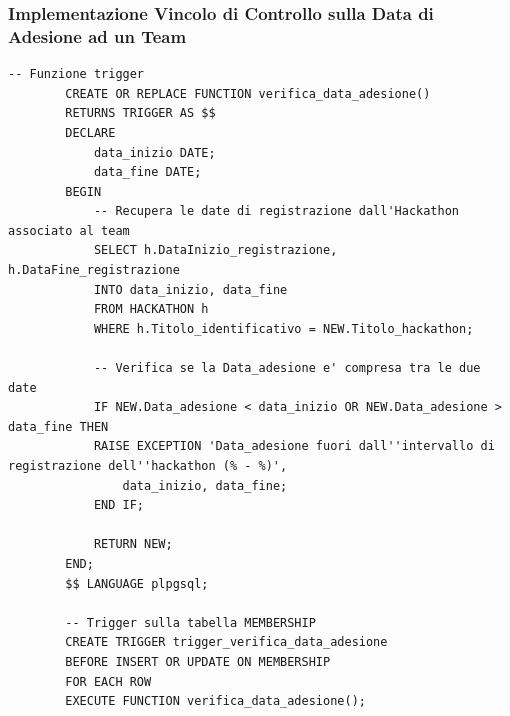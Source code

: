 \documentclass[a4paper, 10pt]{article}
\begin{document}
	\subsubsection{Implementazione Vincolo di Controllo sulla Data di Adesione ad un Team}
	\begin{lstlisting}[style=sqlstyle]
		-- Funzione trigger
		CREATE OR REPLACE FUNCTION verifica_data_adesione()
		RETURNS TRIGGER AS $$
		DECLARE
			data_inizio DATE;
			data_fine DATE;
		BEGIN
			-- Recupera le date di registrazione dall'Hackathon associato al team
			SELECT h.DataInizio_registrazione, h.DataFine_registrazione
			INTO data_inizio, data_fine
			FROM HACKATHON h
			WHERE h.Titolo_identificativo = NEW.Titolo_hackathon;
			
			-- Verifica se la Data_adesione e' compresa tra le due date
			IF NEW.Data_adesione < data_inizio OR NEW.Data_adesione > data_fine THEN
			RAISE EXCEPTION 'Data_adesione fuori dall''intervallo di registrazione dell''hackathon (% - %)', 
				data_inizio, data_fine;
			END IF;
			
			RETURN NEW;
		END;
		$$ LANGUAGE plpgsql;
		
		-- Trigger sulla tabella MEMBERSHIP
		CREATE TRIGGER trigger_verifica_data_adesione
		BEFORE INSERT OR UPDATE ON MEMBERSHIP
		FOR EACH ROW
		EXECUTE FUNCTION verifica_data_adesione();
	\end{lstlisting}
\end{document}
